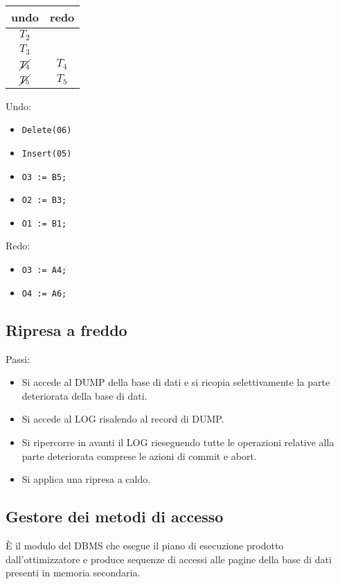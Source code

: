 \documentclass[a4paper, 10pt]{article}
\theoremstyle{definition}
\begin{document}
\bigskip

	\begin{multicols}{3}
		\begin{tabular}{cc}
			undo & redo \\
			\midrule
			$T_2$ & \\
			$T_3$ & \\
			$\cancel{T_4}$ & $ T_4 $ \\
			$\cancel{T_5}$ & $ T_5 $
		\end{tabular}
		
		\columnbreak
		
		Undo:
		\begin{itemize}
			\item \lstinline|Delete(06)|
			\item \lstinline|Insert(05)|
			\item \lstinline|O3 := B5;|
			\item \lstinline|O2 := B3;|
			\item \lstinline|O1 := B1;|
		\end{itemize}	
		
		\columnbreak 
		
		Redo:
		\begin{itemize}
			\item \lstinline|O3 := A4;|
			\item \lstinline|O4 := A6;|
		\end{itemize}
	\end{multicols}
	
	\newpage

	\subsection*{Ripresa a freddo}
	Passi:
	\begin{itemize}
		\item Si accede al DUMP della base di dati e si ricopia
		selettivamente la parte deteriorata della base di dati.
		\item Si accede al LOG risalendo al record di DUMP.
		\item Si ripercorre in avanti il LOG rieseguendo tutte le
		operazioni relative alla parte deteriorata comprese le
		azioni di commit e abort.
		\item Si applica una ripresa a caldo.
	\end{itemize}
	
	\subsection{Gestore dei metodi di accesso}
	È il modulo del DBMS che esegue il piano di
	esecuzione prodotto dall'ottimizzatore e produce
	sequenze di accessi alle pagine della base di dati
	presenti in memoria secondaria.
	
\end{document}
